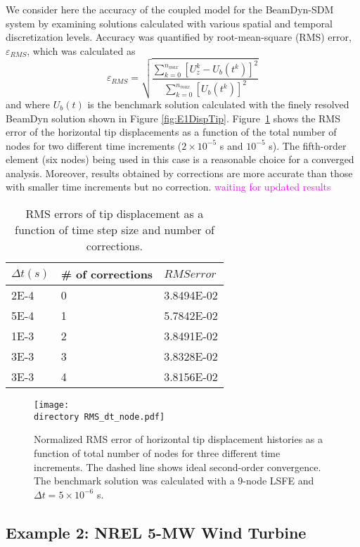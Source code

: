 \documentclass{aiaa-tc}
\def\directory{EPSF/}
\newcommand{\mas}[1]{\textcolor{magenta}{#1}}
\begin{document}
We consider here the accuracy of the coupled model for the BeamDyn-SDM system by examining solutions calculated with various spatial and temporal discretization levels.
Accuracy was quantified by root-mean-square (RMS) error, $\varepsilon_{RMS}$,  which was calculated as
\begin{equation}
\varepsilon_{RMS}=\sqrt{\frac{\sum_{k=0}^{n_{max}}[U_z^k-U_b(t^k)]^2}{\sum_{k=0}^{n_{max}}[U_b(t^k)]^2}}
\label{RMSdefi}
\end{equation} 
and where $U_b(t)$ is the benchmark solution calculated with the finely resolved BeamDyn solution shown in Figure \ref{fig:E1DispTip}. Figure~\ref{fig:ConvDTNode} shows the RMS error of the horizontal tip displacements as a function of the total number of nodes for two different time increments ($2 \times 10^{-5}$ s and $10^{-5}$ s).
The fifth-order element (six nodes) being used in this case is a reasonable choice for a converged analysis. 
Moreover, results obtained by corrections are more accurate than those with smaller time increments but no correction.
\mas{waiting for updated results}
\begin{table}[h]
    \centering
    \begin{tabular}{| l | l | l |}
    \hline
    $\Delta t (s)$ & \# of corrections & $RMS error$ \\ \hline
    2E-4 & 0 & 3.8494E-02 \\ \hline
    5E-4 & 1 & 5.7842E-02 \\ \hline
    1E-3 & 2 & 3.8491E-02 \\ \hline
    3E-3 & 3 & 3.8328E-02 \\ \hline
    3E-3 & 4 & 3.8156E-02 \\
    \hline
    \end{tabular}
    \label{tab:RMS_pc}
    \caption{RMS errors of tip displacement as a function of time step size and number of corrections.}
\end{table}

\begin{figure}[h!tp]
\centering
\texttt{[image: \\directory RMS\_dt\_node.pdf]}
\caption{Normalized RMS error of horizontal tip displacement  histories as a function of total number of nodes for three different time increments. The dashed line shows ideal second-order convergence. The benchmark solution was calculated with a 9-node LSFE and $\Delta t = 5 \times 10^{-6}$ s.} 
\label{fig:ConvDTNode}
\end{figure}

\subsection{Example 2: NREL 5-MW Wind Turbine}
\end{document}
